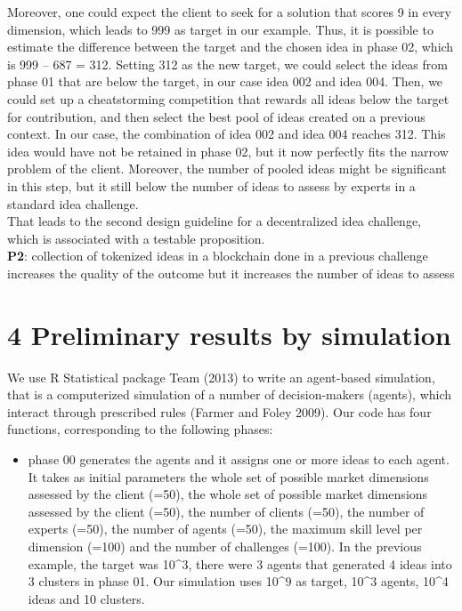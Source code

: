 \documentclass[]{elsarticle} %
\providecommand{\tightlist}{%
  \setlength{\itemsep}{0pt}\setlength{\parskip}{0pt}}
\begin{document}
Moreover, one could expect the client to seek for a solution that scores
9 in every dimension, which leads to 999 as target in our example. Thus,
it is possible to estimate the difference between the target and the
chosen idea in phase 02, which is 999 -- 687 = 312. Setting 312 as the
new target, we could select the ideas from phase 01 that are below the
target, in our case idea 002 and idea 004. Then, we could set up a
cheatstorming competition that rewards all ideas below the target for
contribution, and then select the best pool of ideas created on a
previous context. In our case, the combination of idea 002 and idea 004
reaches 312. This idea would have not be retained in phase 02, but it
now perfectly fits the narrow problem of the client. Moreover, the
number of pooled ideas might be significant in this step, but it still
below the number of ideas to assess by experts in a standard idea
challenge.\\
That leads to the second design guideline for a decentralized idea
challenge, which is associated with a testable proposition.\\
\textbf{P2}: collection of tokenized ideas in a blockchain done in a
previous challenge increases the quality of the outcome but it increases
the number of ideas to assess

\section{4 Preliminary results by
simulation}\label{preliminary-results-by-simulation}

We use R Statistical package Team (2013) to write an agent-based
simulation, that is a computerized simulation of a number of
decision-makers (agents), which interact through prescribed rules
(Farmer and Foley 2009). Our code has four functions, corresponding to
the following phases:

\begin{itemize}
\tightlist
\item
  phase 00 generates the agents and it assigns one or more ideas to each
  agent. It takes as initial parameters the whole set of possible market
  dimensions assessed by the client (=50), the whole set of possible
  market dimensions assessed by the client (=50), the number of clients
  (=50), the number of experts (=50), the number of agents (=50), the
  maximum skill level per dimension (=100) and the number of challenges
  (=100). In the previous example, the target was 10\^{}3, there were 3
  agents that generated 4 ideas into 3 clusters in phase 01. Our
  simulation uses 10\^{}9 as target, 10\^{}3 agents, 10\^{}4 ideas and
  10 clusters.
\end{itemize}
\end{document}
